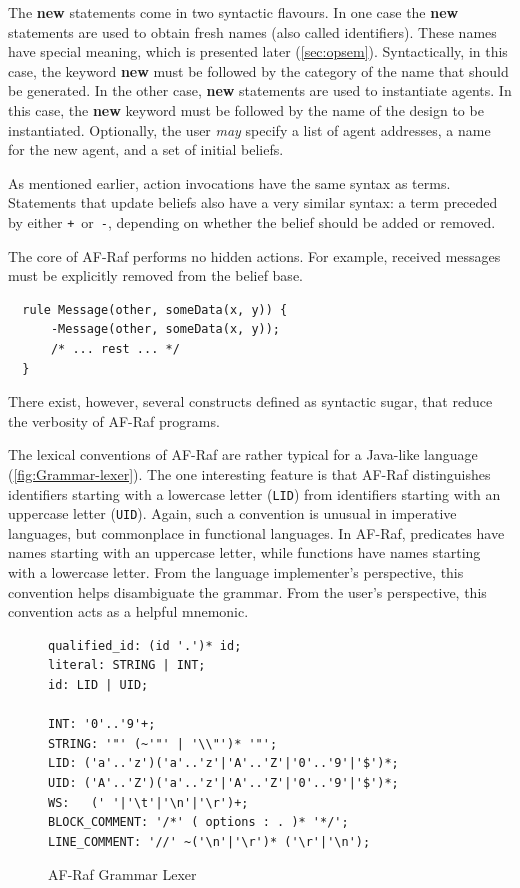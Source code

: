 \documentclass[a4paper,12pt,oneside,fleqn]{book} %
\begin{document}
The {\bf new} statements come in two syntactic flavours. In one case the
{\bf new} statements are used to obtain fresh names (also called
identifiers). These names have special meaning, which is presented later
(\autoref{sec:opsem}). Syntactically, in this case, the keyword {\bf new}
must be followed by the category of the name that should be generated. In
the other case, {\bf new} statements are used to instantiate agents. In
this case, the {\bf new} keyword must be followed by the name of the design
to be instantiated. Optionally, the user \emph{may} specify a list of agent
addresses, a name for the new agent, and a set of initial beliefs.

As mentioned earlier, action invocations have the same syntax as terms.
Statements that update beliefs also have a very similar syntax: a term
preceded by either \verb-+-~or~\verb+-+, depending on whether the belief
should be added or removed.

\begin{example}
The core of AF-Raf performs no hidden actions. For example, received
messages must be explicitly removed from the belief base.
\begin{verbatim}
  rule Message(other, someData(x, y)) {
      -Message(other, someData(x, y));
      /* ... rest ... */
  }
\end{verbatim}
There exist, however, several constructs defined as syntactic sugar, that
reduce the verbosity of AF-Raf programs.
\end{example}

The lexical conventions of AF-Raf are rather typical for a Java-like
language (\autoref{fig:Grammar-lexer}). The one interesting feature is that
AF-Raf distinguishes identifiers starting with a lowercase letter
(\verb+LID+) from identifiers starting with an uppercase letter
(\verb+UID+). Again, such a convention is unusual in imperative languages,
but commonplace in functional languages. In AF-Raf, predicates have names
starting with an uppercase letter, while functions have names starting with
a lowercase letter. From the language implementer's perspective, this
convention helps disambiguate the grammar. From the user's perspective,
this convention acts as a helpful mnemonic.

\begin{figure}\footnotesize %
\begin{verbatim}
qualified_id: (id '.')* id;
literal: STRING | INT;
id: LID | UID;

INT: '0'..'9'+;
STRING: '"' (~'"' | '\\"')* '"';
LID: ('a'..'z')('a'..'z'|'A'..'Z'|'0'..'9'|'$')*;
UID: ('A'..'Z')('a'..'z'|'A'..'Z'|'0'..'9'|'$')*;
WS:   (' '|'\t'|'\n'|'\r')+;
BLOCK_COMMENT: '/*' ( options : . )* '*/';
LINE_COMMENT: '//' ~('\n'|'\r')* ('\r'|'\n');
\end{verbatim}
\caption{AF-Raf Grammar Lexer}
\label{fig:Grammar-lexer}
\end{figure} %
\end{document}
